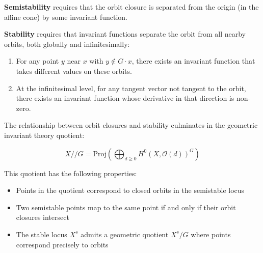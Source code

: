 \documentclass[12pt]{article}
\begin{document}
\begin{remark}
\textbf{Semistability} requires that the orbit closure is separated from the origin (in the affine cone) by some invariant function.

\textbf{Stability} requires that invariant functions separate the orbit from all nearby orbits, both globally and infinitesimally:

\begin{enumerate}
\item For any point $y$ near $x$ with $y \not\in G \cdot x$, there exists an invariant function that takes different values on these orbits.

\item At the infinitesimal level, for any tangent vector not tangent to the orbit, there exists an invariant function whose derivative in that direction is non-zero.
\end{enumerate}
\end{remark}


The relationship between orbit closures and stability culminates in the geometric invariant theory quotient:

\begin{equation}
X//G = \text{Proj}\left(\bigoplus_{d \geq 0} H^0(X, \mathcal{O}(d))^G\right)
\end{equation}

This quotient has the following properties:

\begin{itemize}
\item Points in the quotient correspond to closed orbits in the semistable locus

\item Two semistable points map to the same point if and only if their orbit closures intersect

\item The stable locus $X^s$ admits a geometric quotient $X^s/G$ where points correspond precisely to orbits
\end{itemize}
\end{document}
